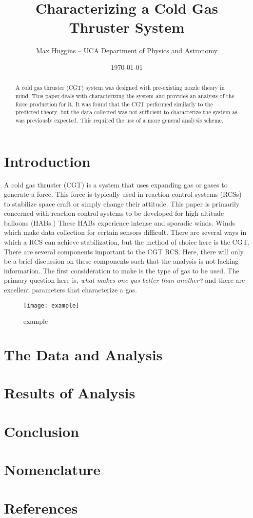 \documentclass[letterpaper,12pt]{article}
\begin{document}
\title{Characterizing a Cold Gas Thruster System}
\author{Max Huggins – UCA Department of Physics and Astronomy}
\date{\today}
\maketitle


\begin{abstract}
A cold gas thruster (CGT) system was designed with pre-existing nozzle theory in mind. This paper deals with characterizing the system and provides an analysis of the force production for it. It was found that the CGT performed similarly to the predicted theory, but the data collected was not sufficient to characterize the system as was previously expected. This required the use of a more general analysis scheme.
\end{abstract}


\section{Introduction}
A cold gas thruster (CGT) is a system that uses expanding gas or gases to generate a force. This force is typically used in reaction control systems (RCSs) to stabilize space craft or simply change their attitude. This paper is primarily concerned with reaction control systems to be developed for high altitude balloons (HABs.) These HABs experience intense and sporadic winds. Winds which make data collection for certain sensors difficult. There are several ways in which a RCS can achieve stabilization, but the method of choice here is the CGT.\\
There are several components important to the CGT RCS. Here, there will only be a brief discussion on these components such that the analysis is not lacking information. The first consideration to make is the type of gas to be used. The primary question here is, \textit{what makes one gas better than another?} and there are excellent parameters that characterize a gas. 

\begin{figure}[!h]
\centering
\texttt{[image: example]}
\caption{example}
\label{figure 1}
\end{figure}\newline




\section{The Data and Analysis}




\section{Results of Analysis}




\section{Conclusion}




\section{Nomenclature}



\section{References}
\end{document}
